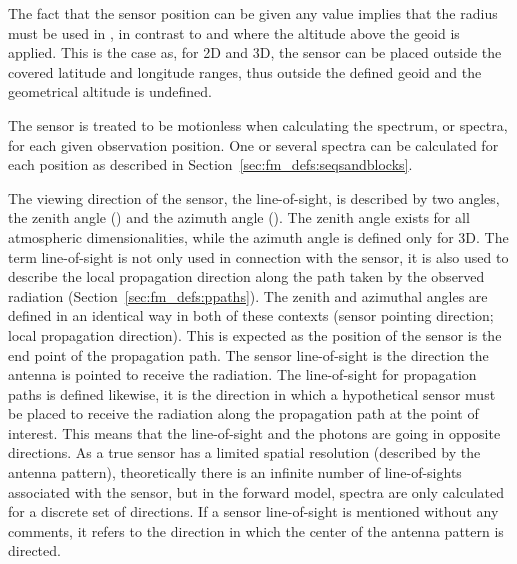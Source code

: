 The fact that the sensor position can be given any value implies that
the radius must be used in , in contrast to
 and  where the altitude
above the geoid is applied. This is the case as, for 2D and 3D, the
sensor can be placed outside the covered latitude and longitude
ranges, thus outside the defined geoid and the geometrical altitude is
undefined. 

The sensor is treated to be motionless when calculating the spectrum,
or spectra, for each given observation position. One or several
spectra can be calculated for each position as described in
Section~\ref{sec:fm_defs:seqsandblocks}.


\label{sec:fm_defs:los}

The viewing direction of the sensor, the line-of-sight, is described
by two angles, the zenith angle (\ZntAng) and the azimuth angle
(\AzmAng). The zenith angle exists for all atmospheric
dimensionalities, while the azimuth angle is defined only for 3D.
The term line-of-sight is not only used in connection with the sensor,
it is also used to describe the local propagation direction along the
path taken by the observed radiation
(Section~\ref{sec:fm_defs:ppaths}).  The zenith and azimuthal angles
are defined in an identical way in both of these contexts (sensor
pointing direction; local propagation direction). This is expected as
the position of the sensor is the end point of the propagation path.
The sensor line-of-sight is the direction the antenna is pointed to
receive the radiation. The line-of-sight for propagation paths is
defined likewise, it is the direction in which a hypothetical sensor
must be placed to receive the radiation along the propagation path at
the point of interest. This means that the line-of-sight and the
photons are going in opposite directions. As a true sensor has a
limited spatial resolution (described by the antenna pattern),
theoretically there is an infinite number of line-of-sights associated
with the sensor, but in the forward model, spectra are only calculated
for a discrete set of directions. If a sensor line-of-sight is
mentioned without any comments, it refers to the direction in which
the center of the antenna pattern is directed.

